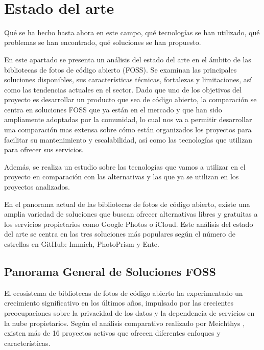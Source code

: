 \newpage
~
\newpage
\section{Estado del arte}
Qué se ha hecho hasta ahora en este campo, qué tecnologías se han utilizado, qué problemas se han encontrado, qué soluciones se han propuesto.

%
%


En este apartado se presenta un análisis del estado del arte en el ámbito de las bibliotecas de fotos de código abierto (FOSS).
Se examinan las principales soluciones disponibles, sus características técnicas, fortalezas y limitaciones, así como las tendencias actuales en el sector.
Dado que uno de los objetivos del proyecto es desarrollar un producto que sea de código abierto, la comparación se centra en soluciones FOSS que ya están en el mercado y que han sido ampliamente adoptadas por la comunidad, lo cual nos va a permitir desarrollar una comparación mas extensa sobre cómo están organizados los proyectos para facilitar su mantenimiento y escalabilidad, así como las tecnologías que utilizan para ofrecer sus servicios.

Además, se realiza un estudio sobre las tecnologías que vamos a utilizar en el proyecto en comparación con las alternativas y las que ya se utilizan en los proyectos analizados.

En el panorama actual de las bibliotecas de fotos de código abierto, existe una amplia variedad de soluciones que buscan ofrecer alternativas libres y gratuitas a los servicios propietarios como Google Photos o iCloud. Este análisis del estado del arte se centra en las tres soluciones más populares según el número de estrellas en GitHub: Immich, PhotoPrism y Ente.

\subsection{Panorama General de Soluciones FOSS}

El ecosistema de bibliotecas de fotos de código abierto ha experimentado un crecimiento significativo en los últimos años, impulsado por las crecientes preocupaciones sobre la privacidad de los datos y la dependencia de servicios en la nube propietarios. Según el análisis comparativo realizado por Meichthys \cite{meichthys2024}, existen más de 16 proyectos activos que ofrecen diferentes enfoques y características.


